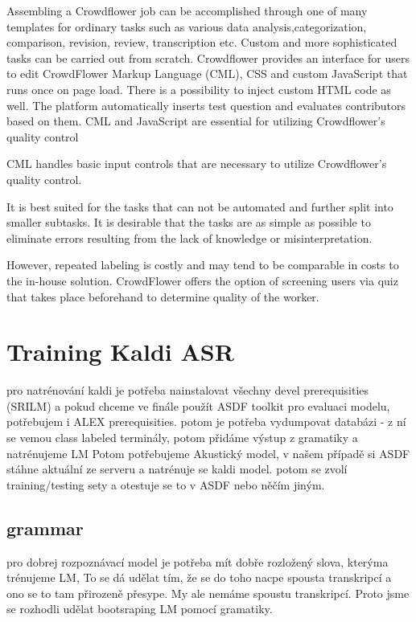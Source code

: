 Assembling a Crowdflower job can be accomplished through one of many templates for ordinary tasks such as various data analysis,categorization, comparison, revision, review, transcription etc. %
Custom and more sophisticated tasks can be carried out from scratch.
Crowdflower provides an interface for users to edit CrowdFlower Markup Language (CML), CSS and custom JavaScript that runs once on page load.
There is a possibility to inject custom HTML code as well.
The platform automatically inserts test question and evaluates contributors based on them.
CML and JavaScript are essential for utilizing Crowdflower's quality control

CML handles basic input controls that are necessary to utilize Crowdflower's quality control. %

It is best suited for the tasks that can not be automated and further split into smaller subtasks.
It is desirable that the tasks are as simple as possible to eliminate errors resulting from the lack of knowledge or misinterpretation.

However, repeated labeling is costly and may tend to be comparable in costs to the in-house solution.
CrowdFlower offers the option of screening users via quiz that takes place beforehand to determine quality of the worker.


\section{Training Kaldi ASR}

pro natrénování kaldi je potřeba nainstalovat všechny devel prerequisities (SRILM) a pokud chceme ve finále použít ASDF toolkit pro evaluaci modelu, potřebujem i ALEX prerequisities. potom je potřeba vydumpovat databázi - z ní se vemou class labeled terminály, potom přidáme výstup z gramatiky a natrénujeme LM Potom potřebujeme Akustický model, v našem případě si ASDF stáhne aktuální ze serveru a natrénuje se kaldi model. potom se zvolí training/testing sety a otestuje se to v ASDF nebo něčím jiným.

\subsection{grammar}

pro dobrej rozpoznávací model je potřeba mít dobře rozložený slova, kterýma trénujeme LM, To se dá udělat tím, že se do toho nacpe spousta transkripcí a ono se to tam přirozeně přesype. My ale nemáme spoustu transkripcí. Proto jsme se rozhodli udělat bootsraping LM pomocí gramatiky.

